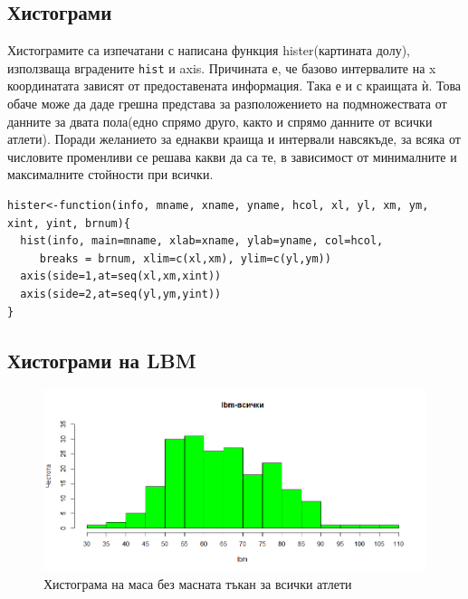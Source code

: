 \documentclass[12pt]{article} %
\begin{document}
\begin{large}
  \section{Хистограми}
  Хистограмите са изпечатани с написана функция hister(картината долу), използваща вградените \texttt{hist} и axis. Причината е, че базово интервалите на x координатата зависят от предоставената информация. Така е и с краищата ѝ. Това обаче може да даде грешна представа за разположението на подмножествата от данните за двата пола(едно спрямо друго, както и спрямо данните от всички атлети). Поради желанието за еднакви краища и интервали навсякъде, за всяка от числовите променливи се решава какви да са те, в зависимост от минималните и максималните стойности при всички.

\begin{verbatim}
hister<-function(info, mname, xname, yname, hcol, xl, yl, xm, ym, xint, yint, brnum){
  hist(info, main=mname, xlab=xname, ylab=yname, col=hcol,
     breaks = brnum, xlim=c(xl,xm), ylim=c(yl,ym))
  axis(side=1,at=seq(xl,xm,xint))
  axis(side=2,at=seq(yl,ym,yint))
}
\end{verbatim}

  \clearpage

  \subsection{Хистограми на LBM}

  \begin{figure}[h!]
    \includegraphics[width=\textwidth,height=\textheight,keepaspectratio]{pics/lbmall}
    \caption{Хистограма на маса без масната тъкан за всички атлети}
  \end{figure}


\end{large}
\end{document}
